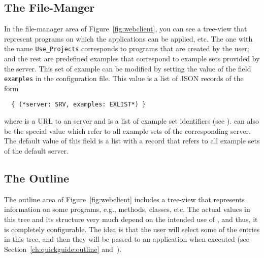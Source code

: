\subsection{The File-Manger}
\label{ch:clients:web:filemanager}

In the file-manager area of Figure~\ref{fig:webclient}, you can see a
tree-view that represent programs on which the applications can be
applied, etc. The one with the name \texttt{Use\_Projects} corresponds
to programs that are created by the user; and the rest are predefined
examples that correspond to example sets provided by the server. This
set of example can be modified by setting the value of the field
\texttt{examples} in the configuration file.  This value is a list of
JSON records of the form

\bigskip
\begin{lstlisting}
  { (*server: SRV, examples: EXLIST*) } 
\end{lstlisting}

\bigskip
\noindent
where  is a URL to an \ei server and  is a list
of example set identifiers (see
).  can also be the special
value  which refer to all example sets of the corresponding
server. The default value of this field is a list with a record that
refers to all example sets of the default server.

\subsection{The Outline}
\label{ch:clients:web:outline}

The outline area of Figure~\ref{fig:webclient} includes a tree-view
that represents information on some programs, e.g., methods, classes,
etc. The actual values in this tree and its structure very much depend
on the intended use of \ei, and thus, it is completely configurable.
%
The idea is that the user will select some of the entries in this
tree, and then they will be passed to an application when executed
(see Section~\ref{ch:quickguide:outline}
and~).

